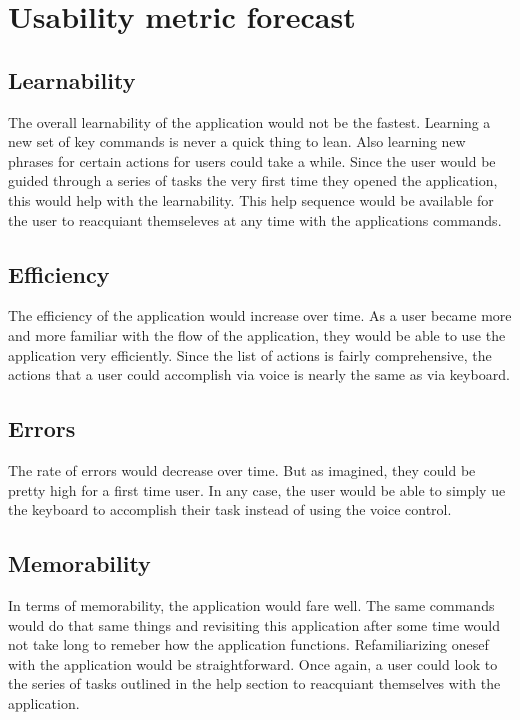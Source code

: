 \documentclass[11pt, oneside]{article}
\begin{document}

\section{Usability metric forecast}

\subsection{Learnability}
The overall learnability of the application would not be the fastest. Learning a new set of key commands is never a quick thing to lean. Also learning new phrases for certain actions for users could take a while. Since the user would be guided through a series of tasks the very first time they opened the application, this would help with the learnability. This help sequence would be available for the user to reacquiant themseleves at any time with the applications commands.

\subsection{Efficiency}
The efficiency of the application would increase over time. As a user became more and more familiar with the flow of the application, they would be able to use the application very efficiently. Since the list of actions is fairly comprehensive, the actions that a user could accomplish via voice is nearly the same as via keyboard.

\subsection{Errors}
The rate of errors would decrease over time. But as imagined, they could be pretty high for a first time user. In any case, the user would be able to simply ue the keyboard to accomplish their task instead of using the voice control.

\subsection{Memorability}
In terms of memorability, the application would fare well. The same commands would do that same things and revisiting this application after some time would not take long to remeber how the application functions. Refamiliarizing onesef with the application would be straightforward. Once again, a user could look to the series of tasks outlined in the help section to reacquiant themselves with the application.
\end{document}
